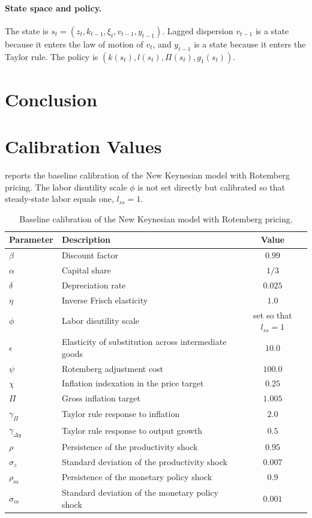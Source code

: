 \documentclass[12pt]{article}
\begin{document}
\paragraph{State space and policy.} The state is $s_t = (z_t, k_{t-1}, \xi_t, v_{t-1}, y_{t-1})$. Lagged dispersion $v_{t-1}$ is a state because it enters the law of motion of $v_t$, and $y_{t-1}$ is a state because it enters the Taylor rule. The policy is $\left(k(s_t), l(s_t), \Pi(s_t), g_1(s_t)\right)$.

\section{Conclusion}\label{sec:conclusion}


\newpage

\appendix

\section{Calibration Values}\label{app:calibration}

 reports the baseline calibration of the New Keynesian model with Rotemberg pricing. The labor disutility scale $\phi$ is not set directly but calibrated so that steady-state labor equals one, $l_{ss} = 1$.

\begin{table}[h!]
\centering
\begin{tabular}{llc}
\toprule
Parameter & Description & Value \\
\midrule
$\beta$ & Discount factor & $0.99$ \\
$\alpha$ & Capital share & $1/3$ \\
$\delta$ & Depreciation rate & $0.025$ \\
$\eta$ & Inverse Frisch elasticity & $1.0$ \\
$\phi$ & Labor disutility scale & set so that $l_{ss} = 1$ \\
$\epsilon$ & Elasticity of substitution across intermediate goods & $10.0$ \\
$\psi$ & Rotemberg adjustment cost & $100.0$ \\
$\chi$ & Inflation indexation in the price target & $0.25$ \\
$\Pi$ & Gross inflation target & $1.005$ \\
$\gamma_\Pi$ & Taylor rule response to inflation & $2.0$ \\
$\gamma_{\Delta y}$ & Taylor rule response to output growth & $0.5$ \\
$\rho$ & Persistence of the productivity shock & $0.95$ \\
$\sigma_z$ & Standard deviation of the productivity shock & $0.007$ \\
$\rho_m$ & Persistence of the monetary policy shock & $0.9$ \\
$\sigma_m$ & Standard deviation of the monetary policy shock & $0.001$ \\
\bottomrule
\end{tabular}
\caption{Baseline calibration of the New Keynesian model with Rotemberg pricing.}
\label{tab:calib-nk-rotemberg}
\end{table}
\end{document}

